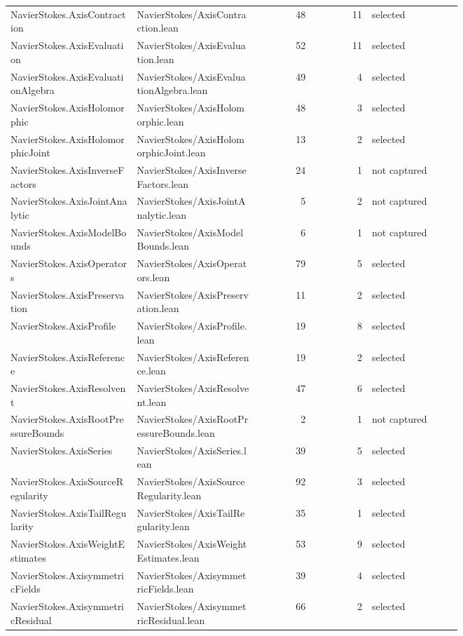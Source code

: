 \documentclass[10pt]{article}
\begin{document}
\begin{longtable}{p{0.28\linewidth}p{0.27\linewidth}r r p{0.20\linewidth}}
NavierStokes.AxisContraction & NavierStokes/AxisContraction.lean & 48 & 11 & selected\\
NavierStokes.AxisEvaluation & NavierStokes/AxisEvaluation.lean & 52 & 11 & selected\\
NavierStokes.AxisEvaluationAlgebra & NavierStokes/AxisEvaluationAlgebra.lean & 49 & 4 & selected\\
NavierStokes.AxisHolomorphic & NavierStokes/AxisHolomorphic.lean & 48 & 3 & selected\\
NavierStokes.AxisHolomorphicJoint & NavierStokes/AxisHolomorphicJoint.lean & 13 & 2 & selected\\
NavierStokes.AxisInverseFactors & NavierStokes/AxisInverseFactors.lean & 24 & 1 & not captured\\
NavierStokes.AxisJointAnalytic & NavierStokes/AxisJointAnalytic.lean & 5 & 2 & not captured\\
NavierStokes.AxisModelBounds & NavierStokes/AxisModelBounds.lean & 6 & 1 & not captured\\
NavierStokes.AxisOperators & NavierStokes/AxisOperators.lean & 79 & 5 & selected\\
NavierStokes.AxisPreservation & NavierStokes/AxisPreservation.lean & 11 & 2 & selected\\
NavierStokes.AxisProfile & NavierStokes/AxisProfile.lean & 19 & 8 & selected\\
NavierStokes.AxisReference & NavierStokes/AxisReference.lean & 19 & 2 & selected\\
NavierStokes.AxisResolvent & NavierStokes/AxisResolvent.lean & 47 & 6 & selected\\
NavierStokes.AxisRootPressureBounds & NavierStokes/AxisRootPressureBounds.lean & 2 & 1 & not captured\\
NavierStokes.AxisSeries & NavierStokes/AxisSeries.lean & 39 & 5 & selected\\
NavierStokes.AxisSourceRegularity & NavierStokes/AxisSourceRegularity.lean & 92 & 3 & selected\\
NavierStokes.AxisTailRegularity & NavierStokes/AxisTailRegularity.lean & 35 & 1 & selected\\
NavierStokes.AxisWeightEstimates & NavierStokes/AxisWeightEstimates.lean & 53 & 9 & selected\\
NavierStokes.AxisymmetricFields & NavierStokes/AxisymmetricFields.lean & 39 & 4 & selected\\
NavierStokes.AxisymmetricResidual & NavierStokes/AxisymmetricResidual.lean & 66 & 2 & selected\\

\end{longtable}
\end{document}
